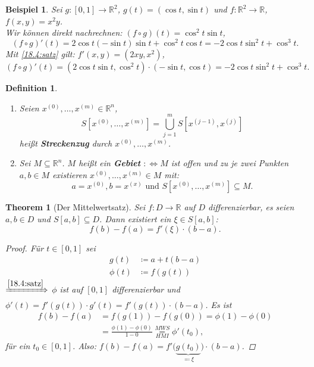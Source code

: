 \documentclass[12pt]{extreport} %
\newcommand{\R}{\mathbb{R}}
\theoremstyle{named}
\newtheorem{unnamedtheorem}{Theorem} \counterwithin{unnamedtheorem}{chapter}
\theoremstyle{nnamed}
\theoremstyle{itshape}
\newtheorem*{definition}{Definition}
\theoremstyle{normal}
\newtheorem*{beispiel*}{Beispiel}
\begin{document}
\begin{beispiel*}
	Sei $g \colon [0, 1] \rightarrow \R^{2}$, $g(t) = \left( \cos t, \sin t \right)$ und $f \colon \R^{2} \rightarrow \R$, $f(x, y) = x^{2} y$. ~\\
	Wir können direkt nachrechnen: $\left( f \circ g \right) (t) = \cos^{2}t \sin t$, 
		$$ \left( f \circ g \right)'(t) = 2 \cos t \left( - \sin t \right) \sin t + \cos^{2} t \cos t = - 2 \cos t \sin^{2} t + \cos^{3} t. $$
	Mit \ref{18.4:satz} gilt: $f'(x,y) = \left( 2 x y, x^{2} \right)$,
	$$ \left( f \circ g \right)'(t) = \left( 2 \cos t \sin t , \cos^{2} t \right) \cdot \left( - \sin t, \cos t \right) = - 2 \cos t \sin^{2} t + \cos^{3} t. $$
\end{beispiel*}

\begin{definition} ~\
	\begin{enumerate}
		\item Seien $x^{(0)}, \dotsc, x^{(m)} \in \R^{n}$,
			$$ S\left[x^{(0)}, \dotsc, x^{(m)}\right] = \bigcup_{j=1}^{m} S\left[x^{(j-1)}, x^{(j)}\right] $$
			hei{\ss}t \textbf{Streckenzug} durch $x^{(0)}, \dotsc, x^{(m)}$.
		\item Sei $M \subseteq \R^{n}$. $M$ hei{\ss}t ein \textbf{Gebiet} $: \iff M$ ist offen und zu je zwei Punkten $a, b \in M$ existieren $x^{(0)}, \dotsc, x^{(m)} \in M$ mit:
			$$ a = x^{(0)}, b = x^{(x)} \text{ und } S \left[ x^{(0)}, \dotsc, x^{(m)} \right] \subseteq M. $$
	\end{enumerate}
\end{definition}


\begin{unnamedtheorem}[Der Mittelwertsatz] \label{18.5:mws}
	Sei $f \colon D \rightarrow \R$ auf $D$ differenzierbar, es seien $a, b \in D$ und $S[a, b] \subseteq D$. Dann existiert ein $\xi \in S[a, b]$:
	$$ f(b) - f(a) = f'(\xi) \cdot (b - a). $$
	\begin{proof}
		Für $t \in [0, 1]$ sei
		\begin{align*}
			g(t) & \coloneqq a + t (b - a) \\
			\phi(t) & \coloneqq f \left( g (t) \right)
		\end{align*}
		$\xRightarrow[]{\ref{18.4:satz}}$ $\phi$ ist auf $[0, 1]$ differenzierbar und $\phi'(t) = f'(g(t)) \cdot g'(t) = f'(g(t)) \cdot ( b - a)$. Es ist
		\begin{align*}
			f(b) - f(a) & = f(g(1)) - f(g(0)) = \phi(1) - \phi(0) \\
						& = \frac{\phi(1) - \phi(0)}{1 - 0} \overset{MWS}{\underset{HM I}{=}} \phi'(t_{0}),
		\end{align*}
		für ein $t_{0} \in [0, 1]$. Also: $f(b) - f(a) = f'\big( \underbrace{g(t_{0})}_{\eqqcolon \xi}\big) \cdot ( b - a)$.
	\end{proof}
\end{unnamedtheorem}
\end{document}

